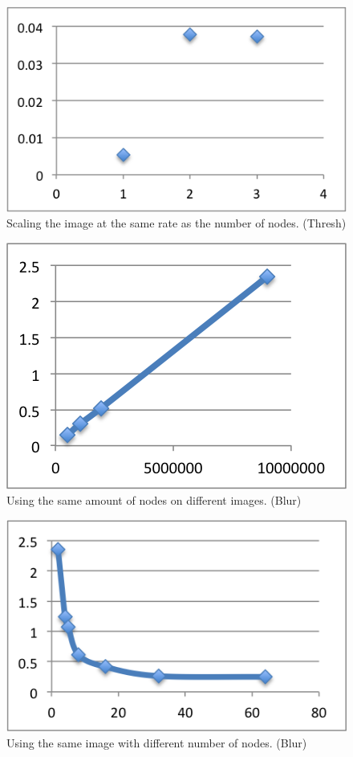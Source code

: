 \documentclass[a4paper]{article}
\begin{document}
\begin{figure}
  \centering
  \includegraphics{samescale.png}
  \caption{Scaling the image at the same rate as the number of nodes. (Thresh)}
  \label{tab:fig3}
\end{figure}

\begin{figure}
  \centering
  \includegraphics{sameProcessorBlur.png}
  \caption{Using the same amount of nodes on different images. (Blur)}
  \label{tab:fig4}
\end{figure}

\begin{figure}
  \centering
  \includegraphics{samePixelsBlur.png}
  \caption{Using the same image with different number of nodes. (Blur)}
  \label{tab:fig5}
\end{figure}
\end{document}
